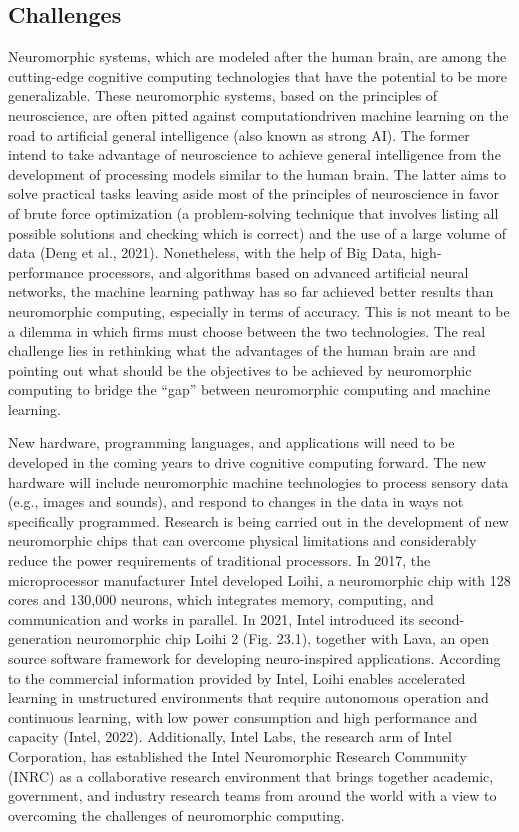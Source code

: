 \documentclass[
  letterpaper,
  DIV=11,
  numbers=noendperiod]{scrreprt}
\begin{document}
\hypertarget{challenges-3}{%
\subsection{Challenges}\label{challenges-3}}

Neuromorphic systems, which are modeled after the human brain, are among
the cutting-edge cognitive computing technologies that have the
potential to be more generalizable. These neuromorphic systems, based on
the principles of neuroscience, are often pitted against
computationdriven machine learning on the road to artificial general
intelligence (also known as strong AI). The former intend to take
advantage of neuroscience to achieve general intelligence from the
development of processing models similar to the human brain. The latter
aims to solve practical tasks leaving aside most of the principles of
neuroscience in favor of brute force optimization (a problem-solving
technique that involves listing all possible solutions and checking
which is correct) and the use of a large volume of data (Deng et al.,
2021). Nonetheless, with the help of Big Data, high-performance
processors, and algorithms based on advanced artificial neural networks,
the machine learning pathway has so far achieved better results than
neuromorphic computing, especially in terms of accuracy. This is not
meant to be a dilemma in which firms must choose between the two
technologies. The real challenge lies in rethinking what the advantages
of the human brain are and pointing out what should be the objectives to
be achieved by neuromorphic computing to bridge the ``gap'' between
neuromorphic computing and machine learning.

New hardware, programming languages, and applications will need to be
developed in the coming years to drive cognitive computing forward. The
new hardware will include neuromorphic machine technologies to process
sensory data (e.g., images and sounds), and respond to changes in the
data in ways not specifically programmed. Research is being carried out
in the development of new neuromorphic chips that can overcome physical
limitations and considerably reduce the power requirements of
traditional processors. In 2017, the microprocessor manufacturer Intel
developed Loihi, a neuromorphic chip with 128 cores and 130,000 neurons,
which integrates memory, computing, and communication and works in
parallel. In 2021, Intel introduced its second-generation neuromorphic
chip Loihi 2 (Fig. 23.1), together with Lava, an open source software
framework for developing neuro-inspired applications. According to the
commercial information provided by Intel, Loihi enables accelerated
learning in unstructured environments that require autonomous operation
and continuous learning, with low power consumption and high performance
and capacity (Intel, 2022). Additionally, Intel Labs, the research arm
of Intel Corporation, has established the Intel Neuromorphic Research
Community (INRC) as a collaborative research environment that brings
together academic, government, and industry research teams from around
the world with a view to overcoming the challenges of neuromorphic
computing.
\end{document}
